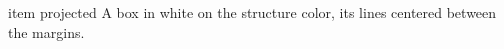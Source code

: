 \documentclass{beamer}
\begin{document}
\begin{frame}
\begin{beamercolorbox}[wd=6cm,sep=2pt,colsep=3pt,colsep*=1pt,center]{item projected}
A box in white on the structure color, its lines centered between the margins.
\end{beamercolorbox}
\end{frame}
\end{document}
